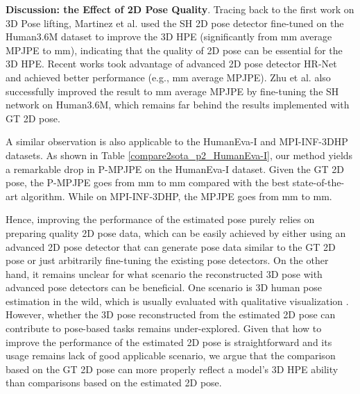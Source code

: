 \documentclass[10pt,twocolumn,letterpaper]{article}
\begin{document}
\noindent \textbf{Discussion: the Effect of 2D Pose Quality}.
Tracing back to the first work on 3D Pose lifting, Martinez et al. \cite{RN011} used the SH 2D pose detector fine-tuned on the Human3.6M dataset to improve the 3D HPE (significantly from mm average MPJPE to mm), indicating that the quality of 2D pose can be essential for the 3D HPE. Recent works \cite{RN014,li2022mhformer,zhang2022mixste} took advantage of advanced 2D pose detector HR-Net and achieved better performance (e.g., mm average MPJPE). Zhu et al. \cite{motionbert2022} also successfully improved the result to mm average MPJPE by fine-tuning the SH network \cite{RN003} on Human3.6M, which remains far behind the results implemented with GT 2D pose. 

A similar observation is also applicable to the HumanEva-I and MPI-INF-3DHP datasets. As shown in Table \ref{compare2sota_p2_HumanEva-I}, our method yields a remarkable  drop in P-MPJPE  on the HumanEva-I dataset. Given the GT 2D pose, the P-MPJPE goes from mm to mm compared with the best state-of-the-art algorithm. While on  MPI-INF-3DHP, the MPJPE goes from mm to mm.

Hence, improving the performance of the estimated pose purely relies on preparing quality 2D pose data, which can be easily achieved by either using an advanced 2D pose detector that can generate pose data similar to the GT 2D pose or just arbitrarily fine-tuning the existing pose detectors.
 On the other hand, it remains unclear for what scenario the reconstructed 3D pose with advanced pose detectors can be beneficial. One scenario is 3D human pose estimation in the wild, which is usually evaluated with qualitative visualization \cite{li2022exploiting}. However, whether the 3D pose reconstructed from the estimated 2D pose can contribute to pose-based tasks remains under-explored. 
 Given that how to improve the performance of the estimated 2D pose is straightforward and its usage remains lack of good applicable scenario, we argue that the comparison based on the GT 2D pose can  more properly reflect a model's 3D HPE ability than comparisons based on the estimated 2D pose. 
\end{document}

